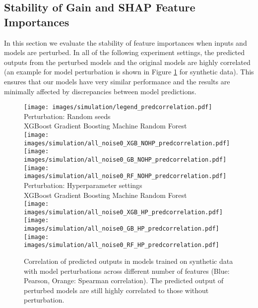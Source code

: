 \vspace{-.3cm}
\subsection{Stability of Gain and SHAP Feature Importances}
\label{results:stability} 
In this section we evaluate the stability of feature importances when inputs and models are perturbed. In all of the following experiment settings, the predicted outputs from the perturbed models and the original models are highly correlated (an example for model perturbation is shown in Figure \ref{fig:pred_corr} for synthetic data). This ensures that our models have very similar performance and the results are minimally affected by discrepancies between model predictions.

 \begin{figure}[h]
  \centering
   \texttt{[image: images/simulation/legend\_predcorrelation.pdf]} \\
  Perturbation: Random seeds \\
     XGBoost  \hspace{1.7cm} Gradient Boosting Machine \hspace{1cm} Random Forest \\ 
  \texttt{[image: images/simulation/all\_noise0\_XGB\_NOHP\_predcorrelation.pdf]}
   \texttt{[image: images/simulation/all\_noise0\_GB\_NOHP\_predcorrelation.pdf]}
    \texttt{[image: images/simulation/all\_noise0\_RF\_NOHP\_predcorrelation.pdf]}
      Perturbation: Hyperparameter settings \\
     XGBoost  \hspace{1.7cm} Gradient Boosting Machine \hspace{1cm} Random Forest \\ 
  \texttt{[image: images/simulation/all\_noise0\_XGB\_HP\_predcorrelation.pdf]}
   \texttt{[image: images/simulation/all\_noise0\_GB\_HP\_predcorrelation.pdf]}
    \texttt{[image: images/simulation/all\_noise0\_RF\_HP\_predcorrelation.pdf]}
  \caption{Correlation of predicted outputs in models trained on synthetic data with model perturbations across different number of features  (Blue: Pearson, Orange: Spearman correlation). The predicted output of perturbed models are still highly correlated to those without perturbation.}
  \label{fig:pred_corr}
\end{figure}

